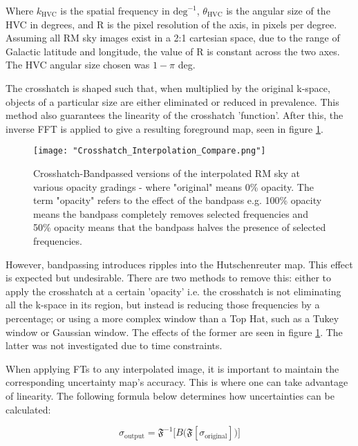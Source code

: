 Where $k_{\mathrm{HVC}}$ is the spatial frequency in $\mathrm{deg}^{-1}$, $\theta_{\mathrm{HVC}}$ is the angular size of the HVC in degrees, and R is the pixel resolution of the axis, in pixels per degree. Assuming all RM sky images exist in a 2:1 cartesian space, due to the range of Galactic latitude and longitude, the value of R is constant across the two axes. The HVC angular size chosen was $1 - \pi$ deg.


The crosshatch is shaped such that, when multiplied by the original k-space, objects of a particular size are either eliminated or reduced in prevalence. This method also guarantees the linearity of the crosshatch 'function'. After this, the inverse FFT is applied to give a resulting foreground map, seen in figure \ref{fig:ripples}.

\begin{figure}
    \texttt{[image: "Crosshatch\_Interpolation\_Compare.png"]}
    \centering
    \caption{Crosshatch-Bandpassed versions of the interpolated RM sky at various opacity gradings - where "original" means 0\% opacity. The term "opacity" refers to the effect of the bandpass e.g. 100\% opacity means the bandpass completely removes selected frequencies and 50\% opacity means that the bandpass halves the presence of selected frequencies.}
    \label{fig:ripples}
\end{figure}


However, bandpassing introduces ripples into the Hutschenreuter map. This effect is expected but undesirable. There are two methods to remove this: either to apply the crosshatch at a certain 'opacity' i.e. the crosshatch is not eliminating all the k-space in its region, but instead is reducing those frequencies by a percentage; or using a more complex window than a Top Hat, such as a Tukey window or Gaussian window. The effects of the former are seen in figure \ref{fig:ripples}. The latter was not investigated due to time constraints.


When applying FTs to any interpolated image, it is important to maintain the corresponding uncertainty map's accuracy. This is where one can take advantage of linearity. The following formula below determines how uncertainties can be calculated:


\begin{equation}
    \sigma_{\mathrm{output}} = \mathbf{\mathfrak{F}}^{-1} \biggl[ B \bigl( \mathbf{\mathfrak{F}} \left[ \sigma_{\mathrm{original}} \right] \bigr) \biggr]
    \label{eq:ft_unc}
\end{equation}


